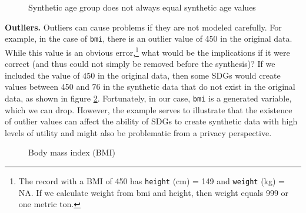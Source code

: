 \documentclass[runningheads]{llncs}
\begin{document}
\begin{figure}[ht!]
    \centering        
    \caption{Synthetic age group does not always equal synthetic age values}
    \label{fig:graph_datasynthesizer_frequency_agegr_errors}
\end{figure}

{\bf Outliers.} Outliers can cause problems if they are not modeled carefully. For example, in the case of \texttt{bmi}, there is an outlier value of 450 in the original data.  While this value is an obvious error,\footnote{The record with a BMI of 450 has \texttt{height} (cm) = 149 and \texttt{weight} (kg) = NA.  If we calculate weight from bmi and height, then weight equals 999 or one metric ton.} what would be the implications if it were correct (and thus could not simply be removed before the synthesis)?  If we included the value of 450 in the original data, then some SDGs would create values between 450 and 76 in the synthetic data that do not exist in the original data, as shown in figure \ref{fig:graph_datasynthesizer_bmi}.  Fortunately, in our case, \texttt{bmi} is a generated variable, which we can drop.  However, the example serves to illustrate that the existence of outlier values can affect the ability of SDGs to create synthetic data with high levels of utility and might also be problematic from a privacy perspective.  


\begin{figure}[ht!]
    \centering        
    \caption{Body mass index (BMI)}
    \label{fig:graph_datasynthesizer_bmi}
\end{figure}
\end{document}
